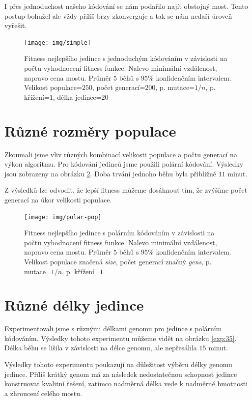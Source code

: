 I přes jednoduchost našeho kódování se nám podařilo najít obstojný most. Tento postup bohužel ale vždy příliš brzy zkonverguje a tak se nám nedaří úroveň vyřešit.

\begin{figure}[p]\centering
\texttt{[image: img/simple]}
\caption{Fitness nejlepšího jedince s jednoduchým kódováním v závislosti na počtu vyhodnocení fitness funkce. Nalevo minimální vzdálenost, napravo cena mostu. Průměr $5$ běhů s $95\%$ konfidenčním intervalem. Velikost populace=$250$, počet generací=$200$, p. mutace=$1/n$, p. křížení=$1$, délka jedince=$20$}
\label{exp:2}
\end{figure}


\section{Různé rozměry populace} \label{sizes}

Zkoumali jsme vliv různých kombinací velikosti populace a počtu generací na výkon algoritmu. Pro kódování jedinců jsme použili polární kódování. Výsledky jsou zobrazeny na obrázku \ref{exp:3}. Doba trvání jednoho běhu byla přibližně $11$ minut.

Z výsledků lze odvodit, že lepší fitness můžeme dosáhnout tím, že zvýšíme počet generací na úkor velikosti populace.

\begin{figure}[p]\centering
\texttt{[image: img/polar-pop]}
\caption{Fitness nejlepšího jedince s polárním kódováním v závislosti na počtu vyhodnocení fitness funkce. Nalevo minimální vzdálenost, napravo cena mostu. Průměr $5$ běhů s $95\%$ konfidenčním intervalem. Velikost populace značená \emph{size}, počet generací značný \emph{gens}, p. mutace=$1/n$, p. křížení=$1$}
\label{exp:3}
\end{figure}

\section{Různé délky jedince}

Experimentovali jsme s různými délkami genomu pro jedince s polárním kódováním. Výsledky tohoto experimentu můžeme vidět na obrázku \ref{exp:35}. Délka běhu se lišila v závislosti na délce genomu, ale nepřesáhla $15$ minut.

Výsledky tohoto experimentu poukazují na důležitost výběru délky genomu jedince. Příliš krátký genom má za následek nedostatečnou schopnost jedince konstruovat kvalitní řešení, zatímco nadměrná délka vede k nadměrné hmotnosti a zhroucení celého mostu.

